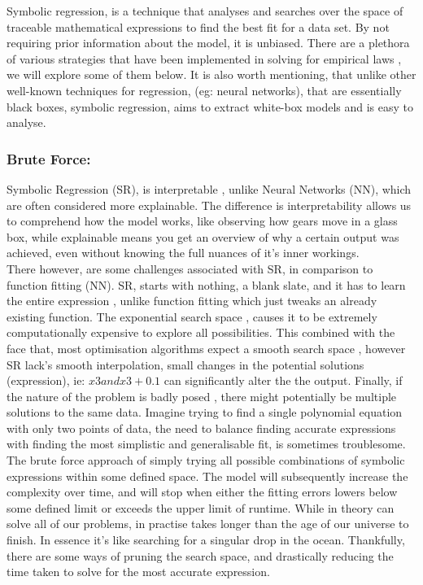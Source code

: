 \documentclass{article}
\begin{document}
Symbolic regression, is a technique that analyses and searches over the space of traceable mathematical
expressions to find the best fit for a data set. By not requiring prior information about the model,
it is unbiased. There are a plethora of various strategies that have been implemented in solving for
empirical laws \cite{Schmidt22009}, we will explore some of them below. It is also worth mentioning, that unlike other
well-known techniques for regression, (eg: neural networks), that are essentially black boxes, symbolic
regression, aims to extract white-box models and is easy to analyse.\\

\subsubsection{Brute Force: }
Symbolic Regression (SR), is interpretable \cite{Aldeia2022}, unlike Neural Networks (NN), which are often considered more explainable. The difference is interpretability allows us to comprehend how the model works,
like observing how gears move in a glass box, while explainable means you get an overview of why a
certain output was achieved, even without knowing the full nuances of it’s inner workings.\\

There however, are some challenges associated with SR, in comparison to function fitting (NN). SR,
starts with nothing, a blank slate, and it has to learn the entire expression \cite{Cranmer2020}, unlike function fitting
which just tweaks an already existing function. The exponential search space \cite{Worm2014} , causes it to be
extremely computationally expensive to explore all possibilities. This combined with the face that,
most optimisation algorithms expect a smooth search space \cite{Makke2024}, however SR lack’s smooth interpolation, small changes in the potential solutions (expression), ie: $ x3 and x3 + 0.1$ can significantly alter
the the output. Finally, if the nature of the problem is badly posed \cite{Rivero2022}, there might potentially be
multiple solutions to the same data. Imagine trying to find a single polynomial equation with only two
points of data, the need to balance finding accurate expressions with finding the most simplistic and
generalisable fit, is sometimes troublesome.\\

The brute force approach of simply trying all possible combinations of symbolic expressions within some defined space. The model will subsequently increase the complexity over time, and will stop when either the fitting errors lowers below some defined limit or exceeds the upper limit of runtime. While in theory can solve all of our problems, in practise takes longer than the age of our universe to finish. In essence it's like searching for a singular drop in the ocean. Thankfully, there are some ways of pruning the search space, and drastically reducing the time taken to solve for the most accurate expression. \\ 
\end{document}

